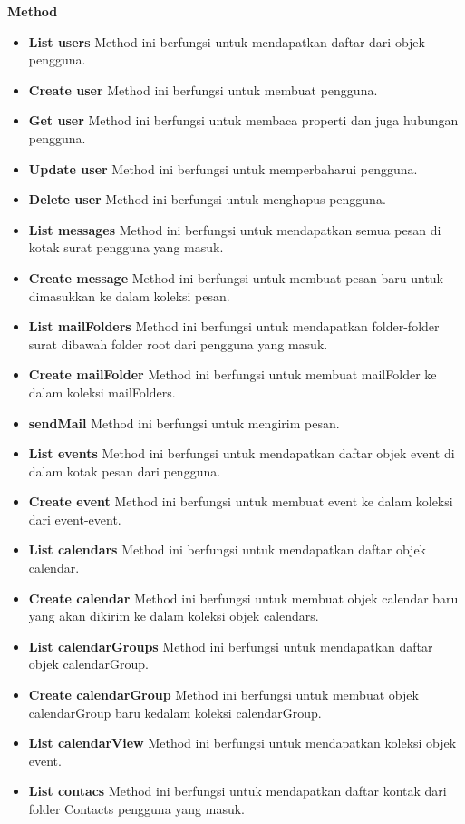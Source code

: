 \textbf{Method}
\begin{itemize}
	\item \textbf{List users}
	Method ini berfungsi untuk mendapatkan daftar dari objek pengguna. 
	\item \textbf{Create user}
	Method ini berfungsi untuk membuat pengguna. 
	\item \textbf{Get user}
	Method ini berfungsi untuk membaca properti dan juga hubungan pengguna. 
	\item \textbf{Update user}
	Method ini berfungsi untuk memperbaharui pengguna.
	\item \textbf{Delete user}
	Method ini berfungsi untuk menghapus pengguna.
	\item \textbf{List messages}
	Method ini berfungsi untuk mendapatkan semua pesan di kotak surat pengguna yang masuk.
	\item \textbf{Create message}
	Method ini berfungsi untuk membuat pesan baru untuk dimasukkan ke dalam koleksi pesan.
	\item \textbf{List mailFolders}
	Method ini berfungsi untuk mendapatkan folder-folder surat dibawah folder root dari pengguna yang masuk.
	\item \textbf{Create mailFolder}
	Method ini berfungsi untuk membuat mailFolder ke dalam koleksi mailFolders.
	\item \textbf{sendMail}
	Method ini berfungsi untuk mengirim pesan.
	\item \textbf{List events}
	Method ini berfungsi untuk mendapatkan daftar objek event di dalam kotak pesan dari pengguna.
	\item \textbf{Create event}
	Method ini berfungsi untuk membuat event ke dalam koleksi dari event-event.
	\item \textbf{List calendars}
	Method ini berfungsi untuk mendapatkan daftar objek calendar.
	\item \textbf{Create calendar}
	Method ini berfungsi untuk membuat objek calendar baru yang akan dikirim ke dalam koleksi objek calendars.
	\item \textbf{List calendarGroups}
	Method ini berfungsi untuk mendapatkan daftar objek calendarGroup.
	\item \textbf{Create calendarGroup}
	Method ini berfungsi untuk membuat objek calendarGroup baru kedalam koleksi calendarGroup.
	\item \textbf{List calendarView}
	Method ini berfungsi untuk mendapatkan koleksi objek event.
	\item \textbf{List contacs}
	Method ini berfungsi untuk mendapatkan daftar kontak dari folder Contacts pengguna yang masuk.

\end{itemize}
